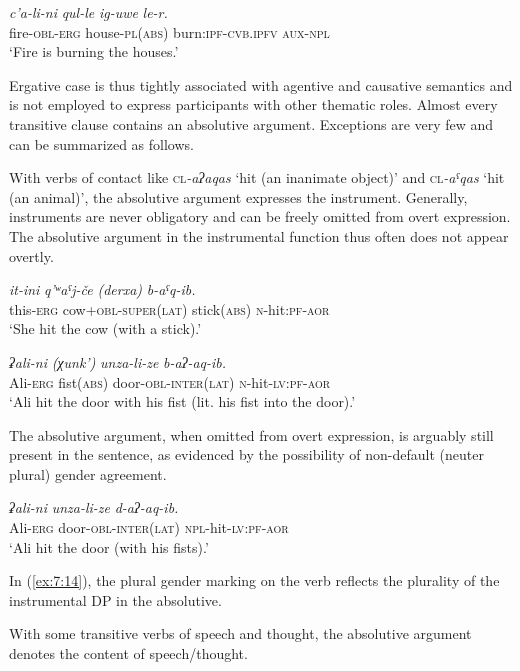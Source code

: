 ﻿\documentclass[output=paper]{langsci/langscibook}
\begin{document}
\ex %
\gll \emph{c'a-li-ni} \emph{qul-le} \emph{ig-uwe} \emph{le-r.}\\
fire-\textsc{obl}-\textsc{erg} house-\textsc{pl}(\textsc{abs}) burn:\textsc{ipf}-\textsc{cvb.ipfv} \textsc{aux}-\textsc{npl}\\
\glt `Fire is burning the houses.'
\z

Ergative case is thus tightly associated with agentive and causative
semantics and is not employed to express participants with other
thematic roles. Almost every transitive clause contains an absolutive
argument. Exceptions are very few and can be summarized as follows.

With verbs of contact like \textsc{cl}\emph{-aʔaqas} `hit (an inanimate object)' and
\textsc{cl}\emph{-aˤqas} `hit (an animal)', the absolutive argument expresses the
instrument. Generally, instruments are never obligatory and can be
freely omitted from overt expression. The absolutive argument in the
instrumental function thus often does not appear overtly.

\ea %
\gll \emph{it-ini} \emph{q'ʷaˤj-če} \emph{(derxa)} \emph{b-aˤq-ib.}\\
{this}-\textsc{erg} cow+\textsc{obl}-\textsc{super(lat)} stick(\textsc{abs}) \textsc{n}-hit:\textsc{pf}-\textsc{aor}\\
\glt `She hit the cow (with a stick).'

\ex %
\gll \emph{ʡali-ni} \emph{(χunk')} \emph{unza-li-ze} \emph{b-aʔ-aq-ib.}\\
Ali-\textsc{erg} fist(\textsc{abs}) door-\textsc{obl}-\textsc{inter(lat)} \textsc{n}-hit-\textsc{lv}:\textsc{pf}-\textsc{aor}\\
\glt `Ali hit the door with his fist (lit. his fist into the door).'
\z

The absolutive argument, when omitted from overt expression, is arguably
still present in the sentence, as evidenced by the possibility of
non-default (neuter plural) gender agreement.

\ea \label{ex:7:14} %
\gll \emph{ʡali-ni} \emph{unza-li-ze} \emph{d-aʔ-aq-ib.}\\
Ali-\textsc{erg} door-\textsc{obl}-\textsc{inter(lat)} \textsc{npl}-hit-\textsc{lv}:\textsc{pf}-\textsc{aor}\\
\glt `Ali hit the door (with his fists).'
\z

In (\ref{ex:7:14}), the plural gender marking on the verb reflects the plurality of
the instrumental DP in the absolutive.

With some transitive verbs of speech and thought, the absolutive
argument denotes the content of speech/thought.
\end{document}
